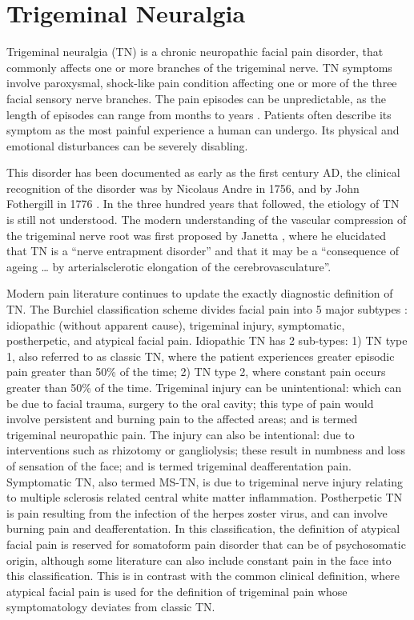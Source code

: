\section{Trigeminal Neuralgia}

Trigeminal neuralgia (TN) is a chronic neuropathic facial pain disorder, that commonly affects one or more branches of the trigeminal nerve. TN symptoms involve paroxysmal, shock-like pain condition affecting one or more of the three facial sensory nerve branches. The pain episodes can be unpredictable, as the length of episodes can range from months to years \cite{Katusic1990}. Patients often describe its symptom as the most painful experience a human can undergo. Its physical and emotional disturbances can be severely disabling. 

This disorder has been documented as early as the first century AD, the clinical recognition of the disorder was by Nicolaus Andre in 1756, and by John Fothergill in 1776 \cite{Katusic1990}. In the three hundred years that followed, the etiology of TN is still not understood. The modern understanding of the vascular compression of the trigeminal nerve root was first proposed by Janetta \cite{Jannetta1967}, where he elucidated that TN is a “nerve entrapment disorder” and that it may be a “consequence of ageing … by arterialsclerotic elongation of the cerebrovasculature”.

Modern pain literature continues to update the exactly diagnostic definition of TN. The Burchiel classification scheme divides facial pain into 5 major subtypes \cite{Burchiel2003,Eller2005}: idiopathic (without apparent cause), trigeminal injury, symptomatic, postherpetic, and atypical facial pain. Idiopathic TN has 2 sub-types: 1) TN type 1, also referred to as classic TN, where the patient experiences greater episodic pain greater than 50\% of the time; 2) TN type 2, where constant pain occurs greater than 50\% of the time. Trigeminal injury can be unintentional: which can be due to facial trauma, surgery to the oral cavity; this type of pain would involve persistent and burning pain to the affected areas; and is termed trigeminal neuropathic pain. The injury can also be intentional: due to interventions such as rhizotomy or gangliolysis; these result in numbness and loss of sensation of the face; and is termed trigeminal deafferentation pain. Symptomatic TN, also termed MS-TN, is due to trigeminal nerve injury relating to multiple sclerosis related central white matter inflammation. Postherpetic TN is pain resulting from the infection of the herpes zoster virus, and can involve burning pain and deafferentation. In this classification, the definition of atypical facial pain is reserved for somatoform pain disorder that can be of psychosomatic origin, although some literature can also include constant pain in the face into this classification. This is in contrast with the common clinical definition, where atypical facial pain is used for the definition of trigeminal pain whose symptomatology deviates from classic TN.

